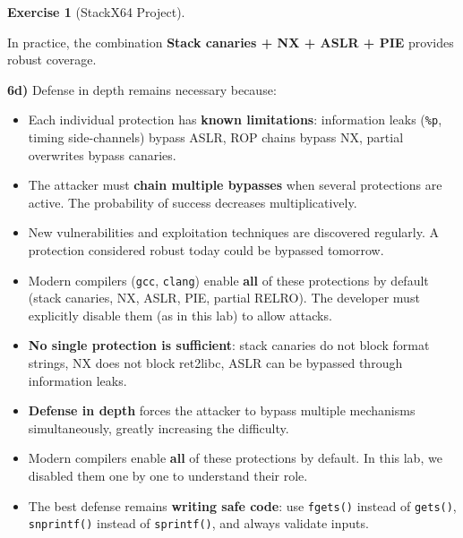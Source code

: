 \documentclass[a4paper,11pt]{article}
\theoremstyle{plain}
\theoremstyle{definition}
\newtheorem{exercice}{Exercise}
\begin{document}
\begin{exercice}[StackX64 Project]
\begin{correction}
In practice, the combination \textbf{Stack canaries + NX + ASLR + PIE} provides robust coverage.

\textbf{6d)} Defense in depth remains necessary because:
\begin{itemize}
    \item Each individual protection has \textbf{known limitations}: information leaks (\texttt{\%p}, timing side-channels) bypass ASLR, ROP chains bypass NX, partial overwrites bypass canaries.
    \item The attacker must \textbf{chain multiple bypasses} when several protections are active. The probability of success decreases multiplicatively.
    \item New vulnerabilities and exploitation techniques are discovered regularly. A protection considered robust today could be bypassed tomorrow.
    \item Modern compilers (\texttt{gcc}, \texttt{clang}) enable \textbf{all} of these protections by default (stack canaries, NX, ASLR, PIE, partial RELRO). The developer must explicitly disable them (as in this lab) to allow attacks.
\end{itemize}

\begin{pointcle}
\begin{itemize}
    \item \textbf{No single protection is sufficient}: stack canaries do not block format strings, NX does not block ret2libc, ASLR can be bypassed through information leaks.
    \item \textbf{Defense in depth} forces the attacker to bypass multiple mechanisms simultaneously, greatly increasing the difficulty.
    \item Modern compilers enable \textbf{all} of these protections by default. In this lab, we disabled them one by one to understand their role.
    \item The best defense remains \textbf{writing safe code}: use \texttt{fgets()} instead of \texttt{gets()}, \texttt{snprintf()} instead of \texttt{sprintf()}, and always validate inputs.
\end{itemize}
\end{pointcle}

\end{correction}

\end{exercice}
\end{document}
